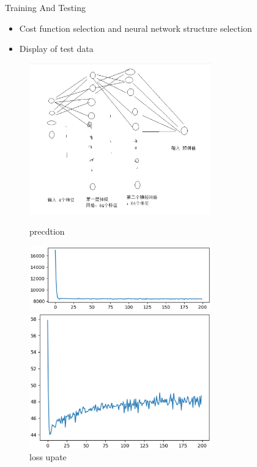 \documentclass[
 size=14pt,
 paper=smartboard,  %
 mode=present, 		%
 display=slides, 	%
 style=tuliplab,  	%
 pauseslide,
 fleqn,leqno]{powerdot}
\begin{document}
\begin{slide}{Training And Testing}


\begin{itemize}
  \item Cost function selection and neural network structure selection
\item  Display of test data
\end{itemize}

\begin{figure}[htbp]
  \centering
  \begin{minipage}[t]{0.38\textwidth}
    \centering
    \includegraphics[width=0.7\textwidth]{logos/7.eps}
    \vspace{-1.4em}
    \caption{precdtion}
  \end{minipage}
  \begin{minipage}[t]{0.38\textwidth}
    \centering
    \includegraphics[width=0.7\textwidth]{logos/1 (1).eps}
    \vspace{-1.4em}
    \caption{loss  upate }
  \end{minipage}
  \begin{minipage}[t]{0.38\textwidth}
    \centering
    \includegraphics[width=0.7\textwidth]{logos/1 (2).eps}

\end{minipage}
\end{figure}
\end{slide}
\end{document}
